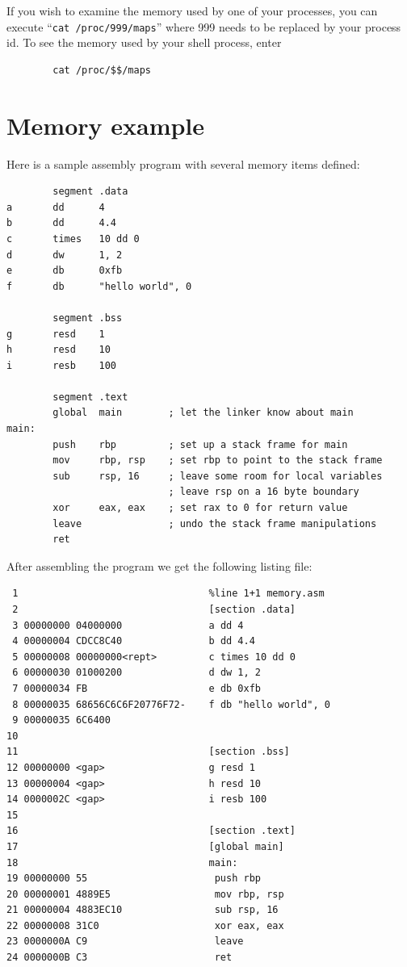 \documentclass[11pt,b5paper]{book}
\begin{document}
If you wish to examine the memory used by one of your processes, you can
execute ``{\tt cat /proc/999/maps}'' where 999 needs to be replaced by your process id.
To see the memory used by your shell process, enter
\begin{verbatim}
        cat /proc/$$/maps
\end{verbatim}

\section{Memory example}

Here is a sample assembly program with several memory items defined:
\begin{verbatim}
        segment .data
a       dd      4
b       dd      4.4
c       times   10 dd 0
d       dw      1, 2
e       db      0xfb
f       db      "hello world", 0

        segment .bss
g       resd    1
h       resd    10
i       resb    100

        segment .text
        global  main        ; let the linker know about main
main:
        push    rbp         ; set up a stack frame for main
        mov     rbp, rsp    ; set rbp to point to the stack frame
        sub     rsp, 16     ; leave some room for local variables
                            ; leave rsp on a 16 byte boundary
        xor     eax, eax    ; set rax to 0 for return value
        leave               ; undo the stack frame manipulations
        ret
\end{verbatim}

After assembling the program we get the following listing file:
\begin{verbatim}
 1                                 %line 1+1 memory.asm
 2                                 [section .data]
 3 00000000 04000000               a dd 4
 4 00000004 CDCC8C40               b dd 4.4
 5 00000008 00000000<rept>         c times 10 dd 0
 6 00000030 01000200               d dw 1, 2
 7 00000034 FB                     e db 0xfb
 8 00000035 68656C6C6F20776F72-    f db "hello world", 0
 9 00000035 6C6400             
10                                 
11                                 [section .bss]
12 00000000 <gap>                  g resd 1
13 00000004 <gap>                  h resd 10
14 0000002C <gap>                  i resb 100
15                                 
16                                 [section .text]
17                                 [global main]
18                                 main:
19 00000000 55                      push rbp
20 00000001 4889E5                  mov rbp, rsp
21 00000004 4883EC10                sub rsp, 16
22 00000008 31C0                    xor eax, eax
23 0000000A C9                      leave
24 0000000B C3                      ret
\end{verbatim}
\end{document}
